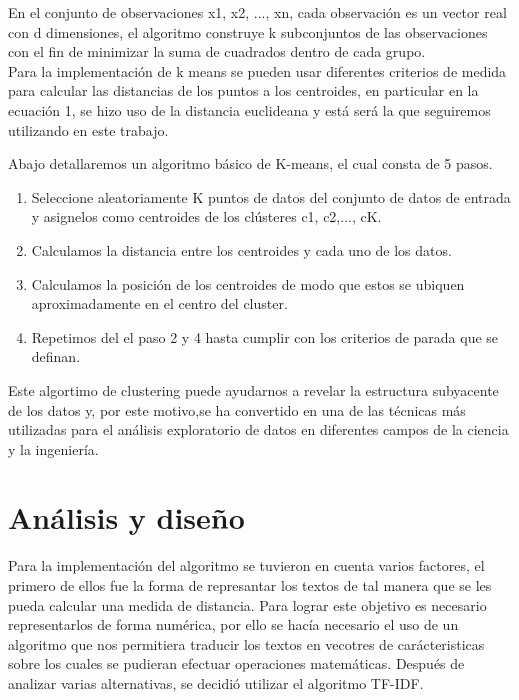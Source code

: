 \documentclass[conference,compsoc]{IEEEtran}
\begin{document}
En el conjunto de observaciones x1, x2, ..., xn, cada observación es un vector
real con d dimensiones, el algoritmo construye k subconjuntos de las
observaciones con el fin de minimizar la suma de cuadrados dentro de cada
grupo.\\

Para la implementación de k means se pueden usar diferentes criterios de medida
para calcular las distancias de los puntos a los centroides, en particular en
la ecuación 1, se hizo uso de la distancia euclideana y está será la que
seguiremos utilizando en este trabajo.

Abajo detallaremos un algoritmo básico de K-means, el cual consta de 5 pasos.\\

\begin{enumerate}
    \item Seleccione aleatoriamente K puntos de datos del conjunto de datos de
          entrada y asignelos como centroides de los clústeres c1, c2,..., cK.
    \item Calculamos la distancia entre los centroides y cada uno de los datos.
    \item Calculamos la posición de los centroides de modo que estos se ubiquen
          aproximadamente en el centro del cluster.
    \item Repetimos del el paso 2 y 4 hasta cumplir con los criterios de parada
          que se definan.
\end{enumerate}

Este algortimo de clustering puede ayudarnos a revelar la estructura subyacente
de los datos y, por este motivo,se ha convertido en una de las técnicas más
utilizadas para el análisis exploratorio de datos en diferentes campos de la
ciencia y la ingeniería.


\section{Análisis y diseño}

Para la implementación del algoritmo se tuvieron en cuenta varios factores,
el primero de ellos fue la forma de represantar los textos de tal manera que se les pueda calcular una medida de distancia. Para lograr este objetivo es
necesario representarlos de forma numérica, por ello se hacía necesario el uso
de un algoritmo que nos permitiera traducir los textos en vecotres de
carácteristicas sobre los cuales se pudieran efectuar operaciones matemáticas. Después de analizar varias alternativas, se decidió utilizar el algoritmo TF-IDF.\\
\end{document}
